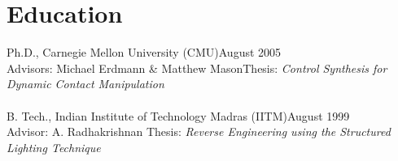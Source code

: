 
\section{Education}
\noindent
Ph.D., Carnegie Mellon University (CMU)\hfill August 2005\\
Advisors: Michael Erdmann \& Matthew Mason\hfill Thesis:  \textit{Control Synthesis for Dynamic Contact Manipulation}\\
\\
B. Tech., Indian Institute of Technology Madras (IITM)\hfill August 1999\\
Advisor: A. Radhakrishnan\hfill
Thesis: \textit{Reverse Engineering using the Structured Lighting Technique}
